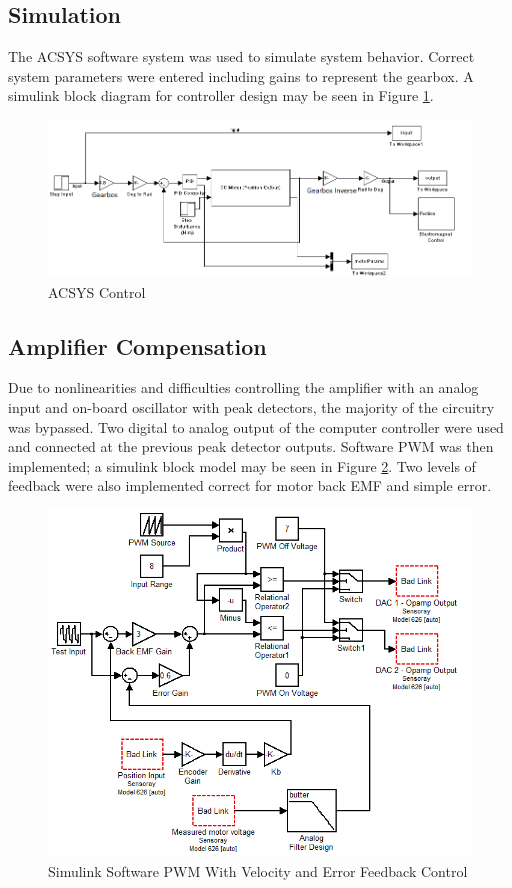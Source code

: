 \subsection{Simulation}

The ACSYS software system was used to simulate system behavior.
Correct system parameters were entered including gains to represent the gearbox.
A simulink block diagram for controller design may be seen in Figure \ref{fig:acsys}.

\begin{figure}[ht]
    \centering
    \includegraphics[width=.95\textwidth]{images/SimulinkBlockDiagram.PNG}
    \caption{ACSYS Control}
    \label{fig:acsys}
\end{figure}

\subsection{Amplifier Compensation}

Due to nonlinearities and difficulties controlling the amplifier with an analog input and on-board oscillator with peak detectors, the majority of the circuitry was bypassed.
Two digital to analog output of the computer controller were used and connected at the previous peak detector outputs.
Software PWM was then implemented; a simulink block model may be seen in Figure \ref{fig:swpwm}.
Two levels of feedback were also implemented correct for motor back EMF and simple error.

 \begin{figure}[ht]
    \centering
    \includegraphics[width=.99\textwidth]{images/swpwm.png}
    \caption{Simulink Software PWM With Velocity and Error Feedback Control}
    \label{fig:swpwm}
\end{figure}

